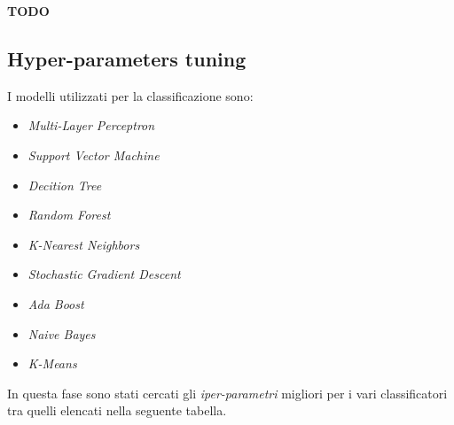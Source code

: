                         \textbf{TODO}
                

        \subsection{Hyper-parameters tuning}
        
                I modelli utilizzati per la classificazione sono:
                \begin{itemize}
                        \item \textit{Multi-Layer Perceptron}
                        \item \textit{Support Vector Machine}
                        \item \textit{Decition Tree}
                        \item \textit{Random Forest}
                        \item \textit{K-Nearest Neighbors}
                        \item \textit{Stochastic Gradient Descent}
                        \item \textit{Ada Boost}
                        \item \textit{Naive Bayes}
                        \item \textit{K-Means}
                \end{itemize}
            
                In questa fase sono stati cercati gli \textit{iper-parametri} migliori per i vari classificatori tra quelli elencati nella seguente tabella.
                

